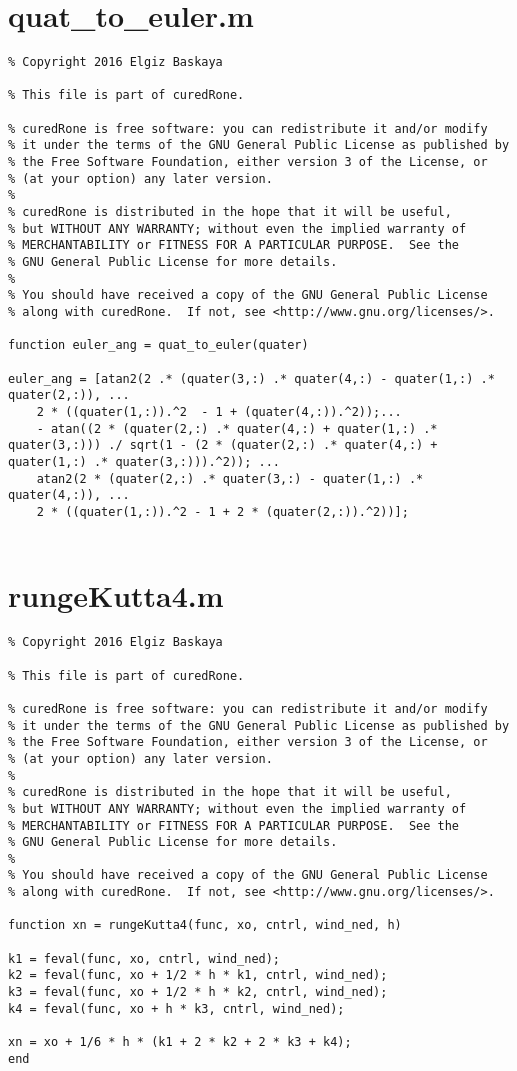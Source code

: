 \section{quat\_to\_euler.m}
\begin{lstlisting}
% Copyright 2016 Elgiz Baskaya

% This file is part of curedRone.

% curedRone is free software: you can redistribute it and/or modify
% it under the terms of the GNU General Public License as published by
% the Free Software Foundation, either version 3 of the License, or
% (at your option) any later version.
% 
% curedRone is distributed in the hope that it will be useful,
% but WITHOUT ANY WARRANTY; without even the implied warranty of
% MERCHANTABILITY or FITNESS FOR A PARTICULAR PURPOSE.  See the
% GNU General Public License for more details.
% 
% You should have received a copy of the GNU General Public License
% along with curedRone.  If not, see <http://www.gnu.org/licenses/>.

function euler_ang = quat_to_euler(quater)

euler_ang = [atan2(2 .* (quater(3,:) .* quater(4,:) - quater(1,:) .* quater(2,:)), ...
    2 * ((quater(1,:)).^2  - 1 + (quater(4,:)).^2));...
    - atan((2 * (quater(2,:) .* quater(4,:) + quater(1,:) .* quater(3,:))) ./ sqrt(1 - (2 * (quater(2,:) .* quater(4,:) + quater(1,:) .* quater(3,:))).^2)); ...
    atan2(2 * (quater(2,:) .* quater(3,:) - quater(1,:) .* quater(4,:)), ...
    2 * ((quater(1,:)).^2 - 1 + 2 * (quater(2,:)).^2))];
    
 \end{lstlisting}
 
\clearpage
\newpage

\section{rungeKutta4.m}
\begin{lstlisting}
% Copyright 2016 Elgiz Baskaya

% This file is part of curedRone.

% curedRone is free software: you can redistribute it and/or modify
% it under the terms of the GNU General Public License as published by
% the Free Software Foundation, either version 3 of the License, or
% (at your option) any later version.
% 
% curedRone is distributed in the hope that it will be useful,
% but WITHOUT ANY WARRANTY; without even the implied warranty of
% MERCHANTABILITY or FITNESS FOR A PARTICULAR PURPOSE.  See the
% GNU General Public License for more details.
% 
% You should have received a copy of the GNU General Public License
% along with curedRone.  If not, see <http://www.gnu.org/licenses/>.

function xn = rungeKutta4(func, xo, cntrl, wind_ned, h)

k1 = feval(func, xo, cntrl, wind_ned);
k2 = feval(func, xo + 1/2 * h * k1, cntrl, wind_ned);
k3 = feval(func, xo + 1/2 * h * k2, cntrl, wind_ned);
k4 = feval(func, xo + h * k3, cntrl, wind_ned);

xn = xo + 1/6 * h * (k1 + 2 * k2 + 2 * k3 + k4);
end
 \end{lstlisting}
 
